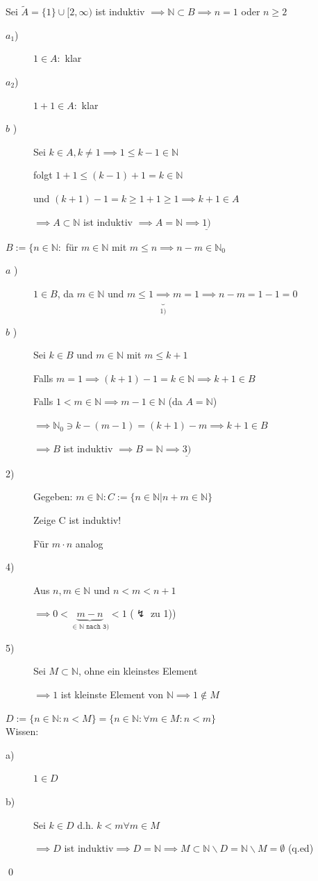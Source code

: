 \documentclass[fleqn]{scrbook}
\newcommand{\N}{\mathbb{N}}
\renewenvironment{proof}{{\bfseries Beweis }}{\qed}
\begin{document}
\begin{proof}
{Sei $\tilde{A} = \{1\} \cup [2, \infty)$ ist induktiv $\implies \N \subset B \implies n = 1$ oder $n \geq 2$}
\begin{description}
\item[$a_1$)] $1 \in A:$ klar
\item[$a_2$)] $1 + 1 \in A:$ klar
\item[$b$  )] Sei $k \in A, k \neq 1 \implies 1 \leq k - 1 \in \N$

folgt $1 + 1 \leq (k - 1) + 1 = k \in \N$

und $(k + 1) - 1 = k \geq 1 + 1 \geq 1 \implies k + 1 \in A$

$\implies A \subset \N$ ist induktiv $\implies A = \N 
\implies \underline{1)}$
\end{description}
$B := \{n \in \N:$ für $m \in \N$ mit $m \leq n \implies n-m \in \N_0$
\begin{description}
\item[$a$  )] $1 \in B$, da $m \in \N$ und $m \leq 1 \underbrace{\implies}_{1)} m = 1 \implies n-m = 1-1 = 0$
\item[$b$  )] Sei $k \in B$ und $m \in \N$ mit $m \leq k + 1$ 

Falls $m = 1 \implies (k + 1) - 1 = k \in \N \implies k + 1 \in B$

Falls $1 < m \in \N \implies m - 1 \in \N$ (da $A = \N$)

$\implies \N_0 \ni k - (m - 1) = (k + 1) - m \implies k + 1 \in B$

$\implies B$ ist induktiv $\implies B = \N \implies \underline{3)}$
\item[2)] Gegeben: $m \in \N: C:=\{n \in \N | n + m \in \N\}$

Zeige C ist induktiv!

Für $m  \cdot  n $ analog

\item[4)] Aus $n,m \in \N \text{ und } n < m < n + 1$

$\implies 0 < \underbrace{m-n}_{\in \N\texttt{ nach 3)}}<1$ ($\lightning$ zu 1))

\item[5)] Sei $M \subset \N$, ohne ein kleinstes Element

$\implies 1$ ist kleinste Element von $\N \implies 1 \notin M$

\end{description}
$D:=\{n \in \N: n < M\} = \{n \in \N: \forall m \in M: n < m\}$\\Wissen:
\begin{description}

\item[a)] $1 \in D$
\item[b)] Sei $k \in D$ d.h. $k < m \forall m \in M$

$\implies D$ ist induktiv$\implies D = \N \implies M \subset \N \backslash D = \N \backslash M = \emptyset$ (q.ed)
\end{description}
\end{proof}
\end{document}
